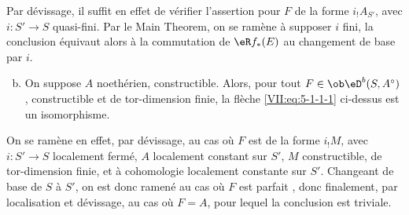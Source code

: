 Par dévissage, il suffit en effet de vérifier l'assertion pour $F$ de la 
forme $i_! A_{S'}$, avec $i:S'\to S$ quasi-fini. Par le Main Theorem, on se 
ramène à supposer $i$ fini, la conclusion équivaut alors à la 
commutation de $\eR f_\ast(E)$ au changement de base par $i$. 
\begin{enumerate}[a)]
\setcounter{enumi}{1}
  \item On suppose $A$ noethérien, constructible. Alors, pour tout 
    $F\in\ob\eD^b(S,A^\circ)$, constructible et de tor-dimension finie, la 
    flèche \eqref{VII:eq:5-1-1-1} ci-dessus est un isomorphisme. 
\end{enumerate}

On se ramène en effet, par dévissage, au cas où $F$ est de la forme 
$i_! M$, avec $i:S'\to S$ localement fermé, $A$ localement constant sur $S'$, 
$M$ constructible, de tor-dimension finie, et à cohomologie localement 
constante sur $S'$. Changeant de base de $S$ à $S'$, on est donc ramené au 
cas où $F$ est parfait \cite[I]{sga6}, donc finalement, par localisation et 
dévissage, au cas où $F=A$, pour lequel la conclusion est triviale. 





\subsubsection{}\label{VII:5-1-3}

